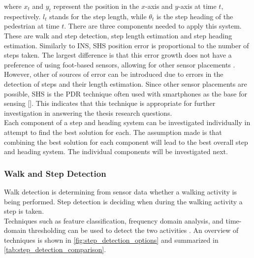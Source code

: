 where $x_{t}$  and  $y_{t}$ represent the position in the $x$-axis and $y$-axis at time  $t$, respectively. $l_{t}$ stands for the step length, while $\theta_{t}$ is the step heading of the pedestrian at time $t$.
There are three components needed to apply this system. These are walk and step detection, step length estimation and step heading estimation.
Similarly to INS, SHS position error is proportional to the number of steps taken. The largest difference is that this error growth does not have a preference of using foot-based sensors, allowing for other sensor placements \cite{Diez2018b}. However, other of sources of error can be introduced due to errors in the detection of steps and their length estimation.  Since other sensor placements are possible, SHS is the PDR technique often used with smartphones as the base for sensing [\qn]. This indicates that this technique is appropriate for further investigation in answering the thesis research questions.\\
Each component of a step and heading system can be investigated individually in attempt to find the best solution for each. The assumption made is that combining the best solution for each component will lead to the best overall step and heading system. The individual components will be investigated next.

\subsubsection{Walk and Step Detection}
\label{sec:rw - step detection}
Walk detection is determining from sensor data whether a walking activity is being performed. Step detection is deciding when during the walking activity a step is taken. \\
Techniques such as feature classification, frequency domain analysis, and time-domain thresholding can be used to detect the two activities \cite{Yang2014}. An overview of techniques  is  shown in \cref{fig:step_detection_options} and summarized in \cref{tab:step_detection_comparison}. %

